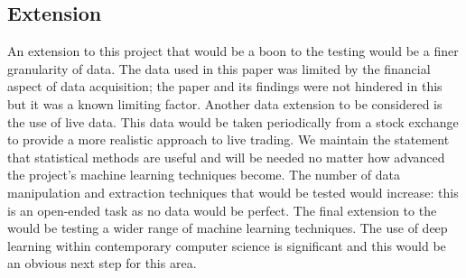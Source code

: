 \documentclass[conference]{IEEEtran}
\begin{document}
\subsection{Extension}

An extension to this project that would be a boon to the testing would be a finer granularity of data. The data used in this paper was limited by the financial aspect of data acquisition; the paper and its findings were not hindered in this but it was a known limiting factor. Another data extension to be  considered is the use of live data. This data would be taken periodically from a stock exchange to provide a more realistic approach to live trading. We maintain the statement that statistical methods are useful and will be needed no matter how advanced the project's machine learning techniques become. The number of data manipulation and extraction techniques that would be tested would increase: this is an open-ended task as no data would be perfect. The final extension to the would be testing a wider range of machine learning techniques. The use of deep learning within contemporary computer science is significant and this would be an obvious next step for this area.

\nocite{*}

\end{document}
